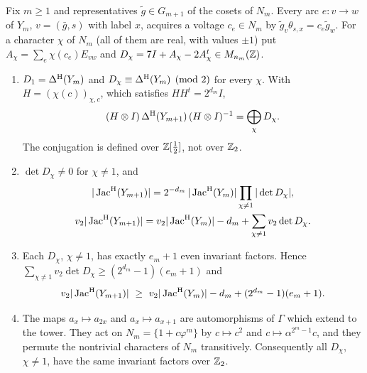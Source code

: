\begin{proposition}\label{V3P6:prop:layer}
Fix $m\ge1$ and representatives $\tilde g\in G_{m+1}$ of the cosets of $N_m$. Every arc
$e\colon v\to w$ of $Y_m$, $v=(\bar g,s)$ with label $x$, acquires a voltage $c_e\in N_m$ by
$\tilde g_v\theta_{s,x}=c_e\tilde g_w$. For a character $\chi$ of $N_m$ (all of them are real,
with values $\pm1$) put $A_\chi=\sum_e\chi(c_e)E_{vw}$ and
$D_\chi=7I+A_\chi-2A_\chi^{t}\in M_{n_m}(\mathbb{Z})$.
\begin{enumerate}
\item[(i)] $D_1=\Delta^{\mathrm{H}}(Y_m)$ and $D_\chi\equiv\Delta^{\mathrm{H}}(Y_m)\pmod2$ for every $\chi$. With
$H=(\chi(c))_{\chi,c}$, which satisfies $HH^{t}=2^{d_m}I$,
\[
(H\otimes I)\,\Delta^{\mathrm{H}}(Y_{m+1})\,(H\otimes I)^{-1}=\bigoplus_{\chi}D_\chi .
\]
The conjugation is defined over $\mathbb{Z}[\tfrac12]$, not over $\mathbb{Z}_2$.
\item[(ii)] $\det D_\chi\ne0$ for $\chi\ne1$, and
\begin{gather*}
|\operatorname{Jac}^{\mathrm{H}}(Y_{m+1})|=2^{-d_m}\,|\operatorname{Jac}^{\mathrm{H}}(Y_m)|\prod_{\chi\ne1}|\det D_\chi|,\\
v_2|\operatorname{Jac}^{\mathrm{H}}(Y_{m+1})|=v_2|\operatorname{Jac}^{\mathrm{H}}(Y_m)|-d_m+\sum_{\chi\ne1}v_2\det D_\chi .
\end{gather*}
\item[(iii)] Each $D_\chi$, $\chi\ne1$, has exactly $e_m+1$ even invariant factors. Hence
$\sum_{\chi\ne1}v_2\det D_\chi\ge(2^{d_m}-1)(e_m+1)$ and
\[
v_2|\JacH(Y_{m+1})|\ \ge\ v_2|\JacH(Y_m)|-d_m+(2^{d_m}-1)(e_m+1).
\]
\item[(iv)] The maps $a_x\mapsto a_{2x}$ and $a_x\mapsto a_{x+1}$ are automorphisms of $\Gamma$
which extend to the tower. They act on $N_m=\{1+c\varphi^{m}\}$ by $c\mapsto c^{2}$ and
$c\mapsto\alpha^{2^{m}-1}c$, and they permute the nontrivial characters of $N_m$ transitively.
Consequently all $D_\chi$, $\chi\ne1$, have the same invariant factors over $\mathbb{Z}_2$.
\end{enumerate}
\end{proposition}

